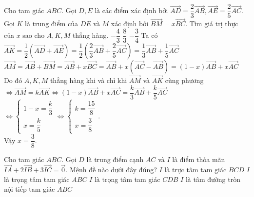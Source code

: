 \begin{ex}%
	Cho tam giác $ABC$. Gọi $D, E$ là các điểm xác định bởi $\overrightarrow{AD} = \dfrac{2}{3}\overrightarrow{AB},\overrightarrow{AE} = \dfrac{2}{5}\overrightarrow{AC}$. Gọi $K$ là trung điểm của $DE$ và $M$ xác định bởi $\overrightarrow{BM} = x\overrightarrow{BC}$. Tìm giá trị thực của $x$ sao cho $A,K,M$ thẳng hàng.
	{$-\dfrac{4}{3}$}
	{$\dfrac{8}{3}$}
	{$-\dfrac{3}{4}$}
	\loigiai
	{Ta có $\overrightarrow {AK}  = \dfrac{1}{2}\left( {\overrightarrow {AD}  + \overrightarrow {AE} } \right) = \dfrac{1}{2}\left( {\dfrac{2}{3}\overrightarrow {AB}  + \dfrac{2}{5}\overrightarrow {AC} } \right) = \dfrac{1}{3}\overrightarrow {AB}  + \dfrac{1}{5}\overrightarrow {AC} $\\
		$\overrightarrow {AM}  = \overrightarrow {AB}  + \overrightarrow {BM}  = \overrightarrow {AB}  + x\overrightarrow {BC}  = \overrightarrow {AB}  + x\left( {\overrightarrow {AC}  - \overrightarrow {AB} } \right) = \left( {1 - x} \right)\overrightarrow {AB}  + x\overrightarrow {AC} $\\
		Do đó $A,K,M$  thẳng hàng khi và chỉ khi $\overrightarrow{AM}$ và $\overrightarrow{AK}$ cùng phương\\
		$ \Leftrightarrow \overrightarrow {AM}  = k\overrightarrow {AK}  \Leftrightarrow \left( {1 - x} \right)\overrightarrow {AB}  + x\overrightarrow {AC}  = \dfrac{k}{3}\overrightarrow {AB}  + \dfrac{k}{5}\overrightarrow {AC} $\\
		$ \Leftrightarrow \left\{ \begin{array}{l}
			1 - x = \dfrac{k}{3}\\
			x = \dfrac{k}{5}
		\end{array} \right. \Leftrightarrow \left\{ \begin{array}{l}
			k = \dfrac{{15}}{8}\\
			x = \dfrac{3}{8}
		\end{array} \right.$.\\
		Vậy $x=\dfrac{3}{8}$.}
\end{ex}
\begin{ex}%
	Cho tam giác $ABC$. Gọi $D$ là trung điểm cạnh $AC$ và $I$ là điểm thỏa mãn \break $\overrightarrow{IA} +2\overrightarrow{IB} +3\overrightarrow{IC}=\overrightarrow{0}$. Mệnh đề nào dưới đây đúng?
	\choice
	{$I$ là trực tâm tam giác $BCD$}
	{$I$ là trọng tâm tam giác $ABC$}
	{\True $I$ là trọng tâm tam giác $CDB$}
	{$I$ là tâm đường tròn nội tiếp tam giác $ABC$}
\end{ex}


